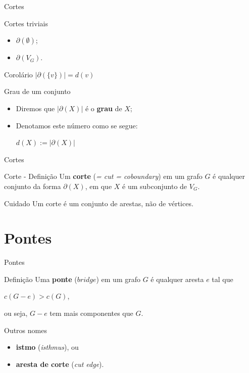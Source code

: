 \documentclass[xcolor=dvipsnames,table]{beamer}
\begin{document}
	\begin{frame}{Cortes}
		\begin{block}{Cortes triviais}
			\begin{itemize}
				\item $\partial( \emptyset )$; 
				\item $\partial( V_G )$.
			\end{itemize}
		\end{block} 
		\begin{block}{Corolário}
			$|\partial(\{v\})| = d(v)$
		\end{block}
		\begin{block}{Grau de um conjunto}
			\begin{itemize}
				\item Diremos que $|\partial(X)|$ é o {\bf grau} de $X$; 
				\item Denotamos este número como se segue:
					\begin{center}
						$d(X) := |\partial(X)|$
					\end{center}
			\end{itemize}
		\end{block}
	\end{frame}
	
	\begin{frame}{Cortes}
		\begin{block}{Corte - Definição}
			Um {\bf corte} ({\it = cut = coboundary}) em um grafo $G$ é qualquer conjunto da forma $\partial(X)$, em que $X$ é um subconjunto de $V_G$.
		\end{block} 
		\begin{alertblock}{Cuidado}
			Um corte é um conjunto de arestas, não de vértices.
		\end{alertblock}
	\end{frame}
	
	\section{Pontes}
	\begin{frame}{Pontes}
		\begin{block}{Definição}
			Uma {\bf ponte} ($bridge$) em um grafo $G$ é qualquer aresta $e$ tal que 
			\begin{center}
				$c(G - e) > c(G)$,  
			\end{center}
			ou seja, $G - e$ tem mais componentes que $G$.				
		\end{block} \pause
		\begin{block}{Outros nomes}
			\begin{itemize}
				\item {\bf istmo} ({\it isthmus}), ou 
			 	\item {\bf aresta de corte} ({\it cut edge}).
			 \end{itemize}
		\end{block}
	\end{frame}
	
\end{document}
